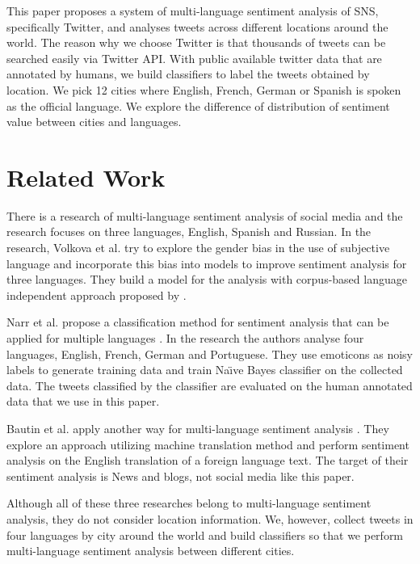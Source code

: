 \documentclass[twocolumn]{article}
\begin{document}
This paper proposes a system of multi-language sentiment analysis of SNS, specifically Twitter, and analyses tweets across different locations around the world.
The reason why we choose Twitter is that thousands of tweets can be searched easily via Twitter API.
With public available twitter data that are annotated by humans, we build classifiers to label the tweets obtained by location.
We pick 12 cities where English, French, German or Spanish is spoken as the official language.
We explore the difference of distribution of sentiment value between cities and languages.

\vspace{-6mm}

\section{Related Work}
\vspace{-2mm}
There is a research of multi-language sentiment analysis of social media \cite{related_work1} and the research focuses on three languages, English, Spanish and Russian.
In the research, Volkova et al. try to explore the gender bias in the use of subjective language and incorporate this bias into models to improve sentiment analysis for three languages.
They build a model for the analysis with corpus-based language independent approach proposed by \cite{twitter_lexicon}.  

Narr et al. propose a classification method for sentiment analysis that can be applied for multiple languages \cite{dataset}.
In the research the authors analyse four languages, English, French, German and Portuguese.
They use emoticons as noisy labels to generate training data and train Na\"\i ve Bayes classifier on the collected data.
The tweets classified by the classifier are evaluated on the human annotated data that we use in this paper.

Bautin et al. apply another way for multi-language sentiment analysis \cite{related_work3}.
They explore an approach utilizing machine translation method and perform sentiment analysis on the English translation of a foreign language text.
The target of their sentiment analysis is News and blogs, not social media like this paper.

Although all of these three researches belong to multi-language sentiment analysis, they do not consider location information.
We, however, collect tweets in four languages by city around the world and build classifiers so that we perform multi-language sentiment analysis between different cities.
\end{document}
